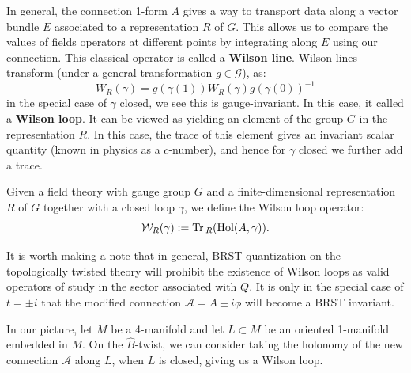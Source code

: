 	In general, the connection 1-form $A$ gives a way to transport data along a vector bundle $E$ associated to a representation $R$ of $G$. This allows us to compare the values of fields operators at different points by integrating along $E$ using our connection. %
	This classical operator is called a \textbf{Wilson line}.
	Wilson lines transform (under a general transformation $g \in \mathcal G$), as:
	\begin{equation}
		W_R(\gamma) = g(\gamma(1)) W_R(\gamma)  g(\gamma(0))^{-1}
	\end{equation}
	in the special case of $\gamma$ closed, we see this is gauge-invariant. In this case, it called a \textbf{Wilson loop}. It can be viewed as yielding an element of the group $G$ in the representation $R$. In this case, the trace of this element gives an invariant scalar quantity (known in physics as a $c$-number), and hence for $\gamma$ closed we further add a trace.
	\begin{defn}
		Given a field theory with gauge group $G$ and a finite-dimensional representation $R$ of $G$ together with a closed loop $\gamma$, we define the Wilson loop operator:
		\begin{equation}
			\mathcal W_{R}(\gamma) := \mathrm{Tr}\,_R ( \mathrm{Hol}(A, \gamma)).
		\end{equation}
	\end{defn}
\noindent

	It is worth making a note that in general, BRST quantization on the topologically twisted theory will prohibit the existence of Wilson loops as valid operators of study in the sector associated with $Q$. It is only in the special case of $t = \pm i$ that the modified connection $\mathcal A = A \pm i \phi$ will become a BRST invariant. 
	
	In our picture, let $M$ be a 4-manifold and let $L \subset M$ be an oriented 1-manifold embedded in $M$. On the $\hat B$-twist, we can consider taking the holonomy of the new connection $\mathcal A$ along $L$, when $L$ is closed, giving us a Wilson loop. 
	
	
